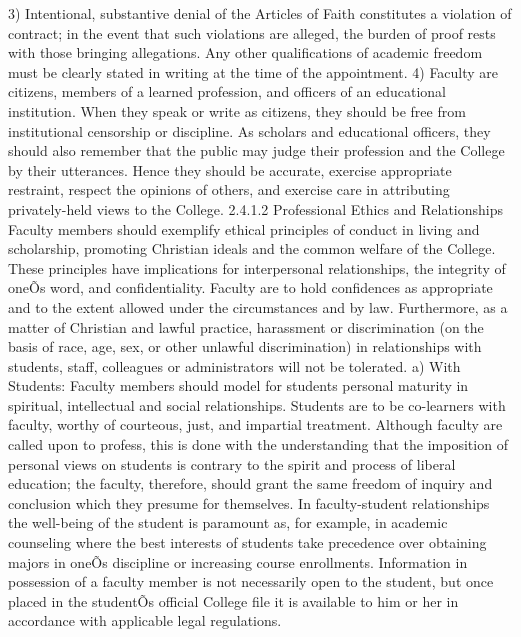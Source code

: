 \documentclass[letterpaper, 11pt]{article}
\begin{document}
	3) Intentional, substantive denial of the Articles of Faith constitutes a violation of contract; in the event that such violations are alleged, the burden of proof rests with those bringing allegations.  Any other qualifications of academic freedom must be clearly stated in writing at the time of the appointment.
	4) Faculty are citizens, members of a learned profession, and officers of an educational institution.  When they speak or write as citizens, they should be free from institutional censorship or discipline.  As scholars and educational officers, they should also remember that the public may judge their profession and the College by their utterances.  Hence they should be accurate, exercise appropriate restraint, respect the opinions of others, and exercise care in attributing privately-held views to the College.
	2.4.1.2 Professional Ethics and Relationships
	Faculty members should exemplify ethical principles of conduct in living and scholarship, promoting Christian ideals and the common welfare of the College.  These principles have implications for interpersonal relationships, the integrity of oneÕs word, and confidentiality.  Faculty are to hold confidences as appropriate and to the extent allowed under the circumstances and by law.  Furthermore, as a matter of Christian and lawful practice, harassment or discrimination (on the basis of race, age, sex, or other unlawful discrimination) in relationships with students, staff, colleagues or administrators will not be tolerated.
	a) With Students:  Faculty members should model for students personal maturity in spiritual, intellectual and social relationships.  Students are to be co-learners with faculty, worthy of courteous, just, and impartial treatment.  Although faculty are called upon to profess, this is done with the understanding that the imposition of personal views on students is contrary to the spirit and process of liberal education; the faculty, therefore, should grant the same freedom of inquiry and conclusion which they presume for themselves.  In faculty-student relationships the well-being of the student is paramount as, for example, in academic counseling where the best interests of students take precedence over obtaining majors in oneÕs discipline or increasing course enrollments.  Information in possession of a faculty member is not necessarily open to the student, but once placed in the studentÕs official College file it is available to him or her in accordance with applicable legal regulations.
\end{document}
